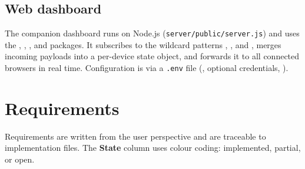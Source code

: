\documentclass[11pt,a4paper]{article}
\begin{document}
\vspace{5pt}
\subsection{Web dashboard}
\vspace{5pt}

The companion dashboard runs on Node.js (\texttt{server/public/server.js}) and uses the
\texttt{}, \texttt{}, \texttt{}, and \texttt{} packages. It subscribes
to the wildcard patterns \texttt{},
\texttt{}, and \texttt{}, merges incoming payloads
into a per-device state object, and forwards it to all connected browsers in real time.
Configuration is via a \texttt{.env} file (\texttt{}, optional credentials, \texttt{}).

\newpage

\section{Requirements}\label{sec:requirements}
\vspace{10pt}

Requirements are written from the user perspective and are traceable to implementation files.
The \textbf{State} column uses colour coding:
\colorbox{stategreen}{\textcolor{stategreentext}{implemented}},
\colorbox{stateyellow}{\textcolor{stateyellowtext}{partial}}, or
\colorbox{statered}{\textcolor{stateredtext}{open}}.
\end{document}
